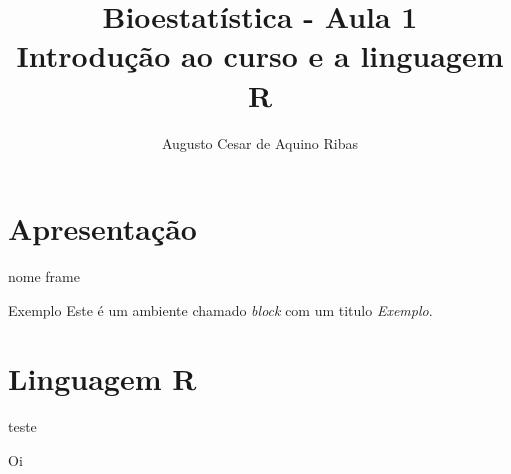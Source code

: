 \documentclass[11pt]{beamer}
\author{Augusto Cesar de Aquino Ribas}
\title[Bioestatística]{Bioestatística - Aula 1 \\
Introdução ao curso e a linguagem R}
\institute{Teste}
\date{}
\begin{document}
\begin{frame}[plain]
\titlepage
\end{frame}

\begin{frame}[plain]
\tableofcontents
\end{frame}

\section{Apresentação}

\begin{frame}{nome frame}

\begin{block}{Exemplo}
Este é um ambiente chamado \emph{block} com um titulo \emph{Exemplo}.
\end{block}

\end{frame}

\section{Linguagem R}
\begin{frame}

teste

\end{frame}


\begin{frame}{Oi}

\end{frame}
\end{document}
